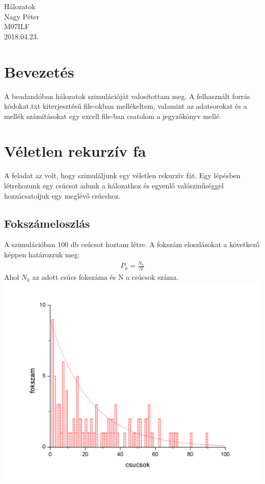 \documentclass[paper=a4, fontsize=11pt]{article}
\begin{document}
\begingroup
	\centering
	\LARGE Hálozatok\\
\vspace{1 cm}
\large Nagy Péter\\
\large M07ILF\\
\vfill
\large 2018.04.23.\\

\newpage

\tableofcontents
\newpage

\section{Bevezetés}
A beadandóban hálozatok szimulációját valosítottam meg. A felhasznált forrás kódokat.txt kiterjesztésű file-okban mellékeltem, valamint az adatsorokat és a mellék számításokat egy excell file-ban csatolom a jegyzőkönyv mellé.
\newpage

\section{Véletlen rekurzív fa}
A feladat az volt, hogy szimuláljunk egy véletlen rekurzív fát. Egy lépésben létrehozunk egy csúcsot adunk a hálozathoz és egyenlő valószinűséggel hozzácsatoljuk egy meglévő csúcshoz. 


\subsection{Fokszámeloszlás}
A szimulációban 100 db csúcsot hoztam létre. A fokszám eloszlásokat a következő képpen határozzuk meg:
\begin{align}
P_k=\frac{N_k}{N}
\end{align}
Ahol $N_k$ az adott csúcs fokszáma és N a csúcsok száma.
\includegraphics[width=\textwidth]{rekurzivfa}
\end{document}
